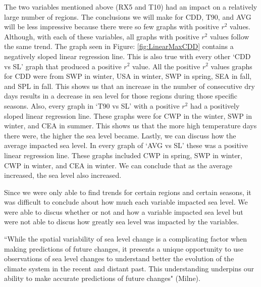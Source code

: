 \documentclass[12pt]{report}
\begin{document}
	\par The two variables mentioned above (RX5 and T10) had an impact on a relatively large number of regions. The conclusions we will make for CDD, T90, and AVG will be less impressive because there were so few graphs with positive $r^2$ values. Although, with each of these variables, all graphs with positive $r^2$ values follow the same trend. The graph seen in Figure: \ref{fig:LinearMaxCDD} contains a negatively sloped linear regression line. This is also true with every other \textquoteleft CDD vs SL' graph that produced a positive $r^2$ value. All the positive $r^2$ values graphs for CDD were from SWP in winter, USA in winter, SWP in spring, SEA in fall, and SPL in fall. This shows us that an increase in the number of consecutive dry days results in a decrease in sea level for those regions during those specific seasons. Also, every graph in \textquoteleft T90 vs SL' with a positive $r^2$ had a positively sloped linear regression line. These graphs were for CWP in the winter, SWP in winter, and CEA in summer. This shows us that the more high temperature days there were, the higher the sea level became. Lastly, we can discuss how the average impacted sea level. In every graph of \textquoteleft AVG vs SL' these was a positive linear regression line. These graphs included CWP in spring, SWP in winter, CWP in winter, and CEA in winter. We can conclude that as the average increased, the sea level also increased.
	\par Since we were only able to find trends for certain regions and certain seasons, it was difficult to conclude about how much each variable impacted sea level. We were able to discus whether or not and how a variable impacted sea level but were not able to discus how greatly sea level was impacted by the variables. 		
	\par \textquotedblleft While the spatial variability of sea level change is a complicating factor when making predictions of future changes, it presents a unique opportunity to use observations of sea level changes to understand better the evolution of the climate system in the recent and distant past. This understanding underpins our ability to make accurate predictions of future changes" (Milne).
\end{document}

